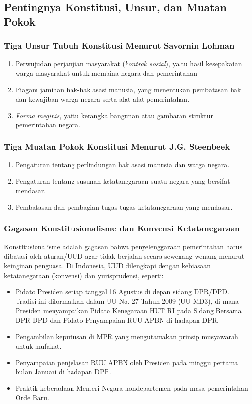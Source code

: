 \subsection{Pentingnya Konstitusi, Unsur, dan Muatan Pokok}
\subsubsection{Tiga Unsur Tubuh Konstitusi Menurut Savornin Lohman}
\begin{enumerate}
\item Perwujudan perjanjian masyarakat (\textit{kontrak sosial}), yaitu hasil kesepakatan warga masyarakat untuk membina negara dan pemerintahan.
\item Piagam jaminan hak-hak asasi manusia, yang menentukan pembatasan hak dan kewajiban warga negara serta alat-alat pemerintahan.
\item \textit{Forma meginis}, yaitu kerangka bangunan atau gambaran struktur pemerintahan negara.
\end{enumerate}

\subsubsection{Tiga Muatan Pokok Konstitusi Menurut J.G. Steenbeek}
\begin{enumerate}
\item Pengaturan tentang perlindungan hak asasi manusia dan warga negara.
\item Pengaturan tentang susunan ketatanegaraan suatu negara yang bersifat mendasar.
\item Pembatasan dan pembagian tugas-tugas ketatanegaraan yang mendasar.
\end{enumerate}

\subsubsection{Gagasan Konstitusionalisme dan Konvensi Ketatanegaraan}
Konstitusionalisme adalah gagasan bahwa penyelenggaraan pemerintahan harus dibatasi oleh aturan/UUD agar tidak berjalan secara sewenang-wenang menurut keinginan penguasa. Di Indonesia, UUD dilengkapi dengan kebiasaan ketatanegaraan (konvensi) dan yurisprudensi, seperti:
\begin{itemize}
\item Pidato Presiden setiap tanggal 16 Agustus di depan sidang DPR/DPD. Tradisi ini diformalkan dalam UU No. 27 Tahun 2009 (UU MD3), di mana Presiden menyampaikan Pidato Kenegaraan HUT RI pada Sidang Bersama DPR-DPD dan Pidato Penyampaian RUU APBN di hadapan DPR.
\item Pengambilan keputusan di MPR yang mengutamakan prinsip musyawarah untuk mufakat.
\item Penyampaian penjelasan RUU APBN oleh Presiden pada minggu pertama bulan Januari di hadapan DPR.
\item Praktik keberadaan Menteri Negara nondepartemen pada masa pemerintahan Orde Baru.
\end{itemize}


